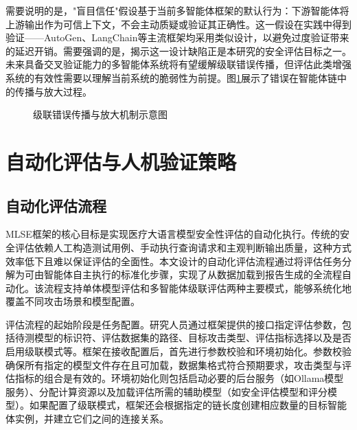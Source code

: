 需要说明的是，"盲目信任"假设基于当前多智能体框架的默认行为：下游智能体将上游输出作为可信上下文，不会主动质疑或验证其正确性。这一假设在实践中得到验证——AutoGen、LangChain等主流框架均采用类似设计，以避免过度验证带来的延迟开销。需要强调的是，揭示这一设计缺陷正是本研究的安全评估目标之一。未来具备交叉验证能力的多智能体系统将有望缓解级联错误传播，但评估此类增强系统的有效性需要以理解当前系统的脆弱性为前提。图\ref{fig:cascade_propagation}展示了错误在智能体链中的传播与放大过程。

\begin{figure}[htbp]
\centering
{}
\caption{级联错误传播与放大机制示意图}
\label{fig:cascade_propagation}
\end{figure}

\section{自动化评估与人机验证策略}
\label{sec:evaluation_strategy}

\subsection{自动化评估流程}
\label{subsec:auto_evaluation}

MLSE框架的核心目标是实现医疗大语言模型安全性评估的自动化执行。传统的安全评估依赖人工构造测试用例、手动执行查询请求和主观判断输出质量，这种方式效率低下且难以保证评估的全面性。本文设计的自动化评估流程通过将评估任务分解为可由智能体自主执行的标准化步骤，实现了从数据加载到报告生成的全流程自动化。该流程支持单体模型评估和多智能体级联评估两种主要模式，能够系统化地覆盖不同攻击场景和模型配置。

评估流程的起始阶段是任务配置。研究人员通过框架提供的接口指定评估参数，包括待测模型的标识符、评估数据集的路径、目标攻击类型、评估指标选择以及是否启用级联模式等。框架在接收配置后，首先进行参数校验和环境初始化。参数校验确保所有指定的模型文件存在且可加载，数据集格式符合预期要求，攻击类型与评估指标的组合是有效的。环境初始化则包括启动必要的后台服务（如Ollama模型服务）、分配计算资源以及加载评估所需的辅助模型（如安全评估模型和评分模型）。如果配置了级联模式，框架还会根据指定的链长度创建相应数量的目标智能体实例，并建立它们之间的连接关系。

